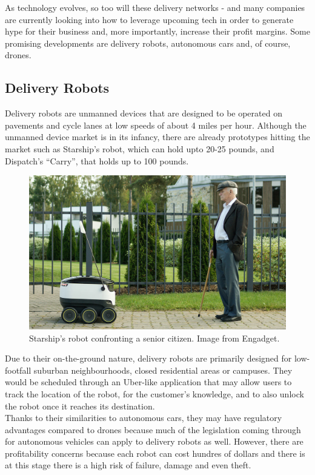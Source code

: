 \documentclass[a4paper,11pt,titlepage]{report}
\begin{document}
As technology evolves, so too will these delivery networks - and many companies are currently looking into how to leverage upcoming tech\cite{Lee2016} in order to generate hype for their business and, more importantly, increase their profit margins. Some promising developments are delivery robots, autonomous cars and, of course, drones.

\subsection{Delivery Robots}
Delivery robots are unmanned devices that are designed to be operated on pavements and cycle lanes at low speeds of about 4 miles per hour\cite{Lee2016}. Although the unmanned device market is in its infancy, there are already prototypes hitting the market such as Starship's robot\cite{Laris2016}, which can hold upto 20-25 pounds, and Dispatch's ``Carry''\cite{Kokalitcheva2016}, that holds up to 100 pounds.

\begin{figure}[!hbpt]
  \center
  \includegraphics[width=\linewidth]{img/starship.jpg}
  \caption{Starship's robot confronting a senior citizen. Image from Engadget\cite{Souppouris2015}.}
  \label{fig:starship_citizen}
\end{figure}

Due to their on-the-ground nature, delivery robots are primarily designed for low-footfall suburban neighbourhoods, closed residential areas or campuses. They would be scheduled through an Uber-like application that may allow users to track the location of the robot, for the customer's knowledge, and to also unlock the robot once it reaches its destination\cite{Hohenadel2015}. \\

Thanks to their similarities to autonomous cars, they may have regulatory advantages compared to drones because much of the legislation coming through for autonomous vehicles can apply to delivery robots as well. However, there are profitability concerns because each robot can cost hundres of dollars and there is at this stage there is a high risk of failure, damage and even theft. \\
\end{document}
